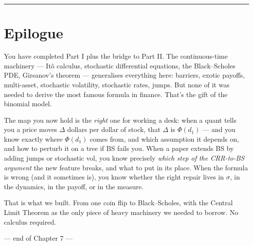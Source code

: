 \documentclass[
  10pt,
  twoside]{book}
\newcounter{none} %
\begin{document}
\begin{center}\rule{0.5\linewidth}{0.5pt}\end{center}

\section{Epilogue}\label{epilogue}

You have completed Part I plus the bridge to Part II. The
continuous-time machinery --- Itô calculus, stochastic differential
equations, the Black--Scholes PDE, Girsanov's theorem --- generalises
everything here: barriers, exotic payoffs, multi-asset, stochastic
volatility, stochastic rates, jumps. But none of it was needed to derive
the most famous formula in finance. That's the gift of the binomial
model.

The map you now hold is the \emph{right} one for working a desk: when a
quant tells you a price moves \(\Delta\) dollars per dollar of stock,
that \(\Delta\) is \(\Phi(d_1)\) --- and you know exactly where
\(\Phi(d_1)\) comes from, and which assumption it depends on, and how to
perturb it on a tree if BS fails you. When a paper extends BS by adding
jumps or stochastic vol, you know precisely \emph{which step of the
CRR-to-BS argument} the new feature breaks, and what to put in its
place. When the formula is wrong (and it sometimes is), you know whether
the right repair lives in \(\sigma\), in the dynamics, in the payoff, or
in the measure.

That is what we built. From one coin flip to Black--Scholes, with the
Central Limit Theorem as the only piece of heavy machinery we needed to
borrow. No calculus required.

--- end of Chapter 7 ---

\backmatter
\end{document}
